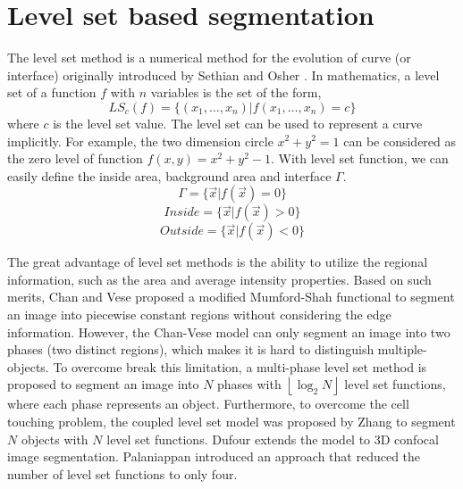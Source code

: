 \section{Level set based segmentation} \label{sec:levelsetseg}
The level set method is a numerical method for the evolution of curve (or interface) originally introduced by Sethian and Osher \cite{malladi1995shape}. In mathematics, a level set of a function $f$ with $n$ variables is the set of the form,
\begin{equation}
LS_c(f) = \{(x_1,\ldots,x_n)|f(x_1,\ldots,x_n) = c\}
\end{equation}
where $c$ is the level set value. The level set can be used to represent a curve implicitly. For example, the two dimension circle $x^2 + y^2 = 1$ can be considered as the zero level of function $f(x,y) = x^2 + y^2 - 1$. With level set function, we can easily define the inside area, background area and interface $\Gamma$.
\begin{equation}
\Gamma = \{\vec{x}|f(\vec{x}) = 0\}
\end{equation}
\begin{equation}
Inside = \{\vec{x}|f(\vec{x}) > 0\}
\end{equation}
\begin{equation}
Outside = \{\vec{x}|f(\vec{x}) < 0\}
\end{equation}

The great advantage of level set methods is the ability to utilize the regional information, such as the area and average intensity properties. Based on such merits, Chan and Vese \cite{chan2001active,chan2000active} proposed a modified Mumford-Shah functional to segment an image into piecewise constant regions without considering the edge information. However, the Chan-Vese model can only segment an image into two phases (two distinct regions), which makes it is hard to distinguish multiple-objects. To overcome break this limitation, a multi-phase level set method \cite{vese2002multiphase} is proposed to segment an image into $N$ phases with $\left \lfloor \log_2N \right \rfloor$ level set functions, where each phase represents an object. Furthermore, to overcome the cell touching problem, the coupled level set model was proposed by Zhang \cite{zhang2004tracking} to segment $N$ objects with $N$ level set functions. Dufour \cite{dufour2005segmenting} extends the model to 3D confocal image segmentation. Palaniappan \cite{nath2006robust} introduced an approach that reduced the number of level set functions to only four.


